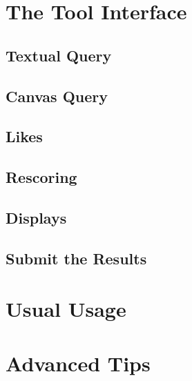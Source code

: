 \section{The Tool Interface}
\label{sec:start}

\subsection{Textual Query}

\subsection{Canvas Query}

\subsection{Likes}

\subsection{Rescoring}

\subsection{Displays}

\subsection{Submit the Results}


\section{Usual Usage}

\section{Advanced Tips}



